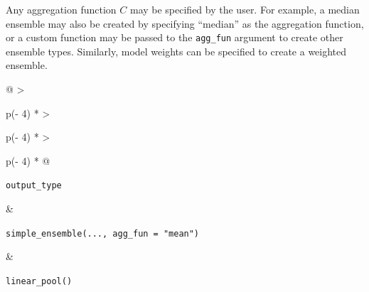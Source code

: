 \documentclass[
]{article}
\begin{document}
Any aggregation function \(C\) may be specified by the user. For
example, a median ensemble may also be created by specifying ``median''
as the aggregation function, or a custom function may be passed to the
\texttt{agg\_fun} argument to create other ensemble types. Similarly,
model weights can be specified to create a weighted ensemble.

\begin{longtable}[]{@{}
  >{\raggedright\arraybackslash}p{(\columnwidth - 4\tabcolsep) * }
  >{\raggedright\arraybackslash}p{(\columnwidth - 4\tabcolsep) * }
  >{\raggedright\arraybackslash}p{(\columnwidth - 4\tabcolsep) * }@{}}
\caption{Summary of ensemble function calculations for each output type.
The ensemble function (columns) determines the operation that is
performed, and in the case of probabilistic output types
(\texttt{quantile}, \texttt{cdf}, \texttt{pmf}), this also determines
what ensemble distribution is generated (quantile average,
\(F_{Q}^{-1}(\theta)\), or linear pool, \(F_{LOP}(x)\)). The resulting
ensemble will be returned in the same output type as the inputs. Thus,
the output type (rows) determines how the resulting ensemble
distribution is summarized (as a quantile function, \(F^{-1}(\theta)\),
cumulative distribution function, \(F(x)\), or probability mass function
\(f(x)\)). Estimating individual model cumulative probabilities is
required to compute a \texttt{linear\_pool()} for predictions of
\texttt{quantile} output type; see Section~\ref{sec-linear-pool} for
details. In the case of \texttt{simple\_ensemble()}, we report the
calculations for the default case where \texttt{agg\_fun\ =\ "mean"};
however, if another aggregation function is chosen (e.g.,
\texttt{agg\_fun\ =\ "median"}), that calculation would be performed
instead. For example,
\texttt{simple\_ensemble(...,\ agg\_fun\ =\ "median")} applied to
predictions of \texttt{mean} output type would return the median of
individual model means.}\label{tbl-fns-by-output-type}\tabularnewline
\toprule\noalign{}
\begin{minipage}[b]{\linewidth}\raggedright
\texttt{output\_type}
\end{minipage} & \begin{minipage}[b]{\linewidth}\raggedright
\texttt{simple\_ensemble(...,\ agg\_fun\ =\ "mean")}
\end{minipage} & \begin{minipage}[b]{\linewidth}\raggedright
\texttt{linear\_pool()}
\end{minipage} \\

\end{longtable}
\end{document}
